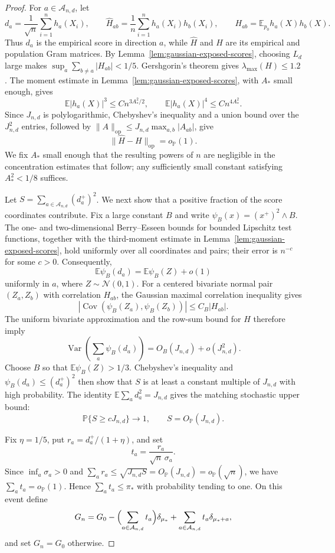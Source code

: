 \documentclass[11pt]{article}
\theoremstyle{definition}
\numberwithin{equation}{section}
\newcommand{\E}{\mathbb{E}}
\newcommand{\wh}{\widehat}
\newcommand{\op}{\mathrm{op}}
\DeclareMathOperator{\Var}{Var}
\DeclareMathOperator{\Cov}{Cov}
\begin{document}
\begin{proof}
For \(a\in\mathcal A_{n,d}\), let
\[
    d_a=\frac1{\sqrt n}\sum_{i=1}^n h_a(X_i),
    \qquad
    \wh H_{ab}=\frac1n\sum_{i=1}^n h_a(X_i)h_b(X_i),
    \qquad
    H_{ab}=\E_{p_0}h_a(X)h_b(X).
\]
Thus \(d_a\) is the empirical score in direction \(a\), while \(\wh H\)
and \(H\) are its empirical and population Gram matrices.
By Lemma~\ref{lem:gaussian-exposed-scores}, choosing \(L_d\) large makes \(\sup_a\sum_{b\ne a}|H_{ab}|<1/5\). Gershgorin's theorem gives \(\lambda_{\max}(H)\le1.2\). The moment estimate in Lemma~\ref{lem:gaussian-exposed-scores}, with \(A_*\) small enough, gives
\[
    \E |h_a(X)|^3\le C n^{3A_*^2/2},
    \qquad
    \E |h_a(X)|^4\le C n^{4A_*^2}.
\]
Since \(J_{n,d}\) is polylogarithmic, Chebyshev's inequality and a union
bound over the \(J_{n,d}^2\) entries, followed by
\(\|A\|_{\op}\le J_{n,d}\max_{a,b}|A_{ab}|\), give
\[
    \|\wh H-H\|_{\op}=o_{\mathbb P}(1).
\]
We fix \(A_*\) small enough that the resulting powers of \(n\) are
negligible in the concentration estimates that follow; any sufficiently small
constant satisfying \(A_*^2<1/8\) suffices.

Let \(S=\sum_{a\in\mathcal A_{n,d}}(d_a^+)^2\). We next show that a positive
fraction of the score coordinates contribute. Fix a large constant \(B\) and
write \(\psi_B(x)=(x^+)^2\wedge B\). The one- and two-dimensional
Berry--Esseen bounds for bounded Lipschitz test functions, together with the
third-moment estimate in Lemma~\ref{lem:gaussian-exposed-scores}, hold
uniformly over all coordinates and pairs;
their error is \(n^{-c}\) for some \(c>0\). Consequently,
\[
    \E\psi_B(d_a)=\E\psi_B(Z)+o(1)
\]
uniformly in \(a\), where \(Z\sim\mathcal N(0,1)\). For a centered bivariate
normal pair \((Z_a,Z_b)\) with correlation \(H_{ab}\), the Gaussian maximal
correlation inequality gives
\[
    |\Cov(\psi_B(Z_a),\psi_B(Z_b))|
    \le C_B|H_{ab}|.
\]
The uniform bivariate approximation and the row-sum bound for \(H\) therefore
imply
\[
    \Var\left(\sum_a\psi_B(d_a)\right)
    =O_B(J_{n,d})+o(J_{n,d}^2).
\]
Choose \(B\) so that \(\E\psi_B(Z)>1/3\). Chebyshev's inequality and
\(\psi_B(d_a)\le(d_a^+)^2\) then show that \(S\) is at least a constant
multiple of \(J_{n,d}\) with high probability. The identity
\(\E\sum_a d_a^2=J_{n,d}\) gives the matching stochastic upper bound:
\[
    \mathbb P\{S\ge cJ_{n,d}\}\to1,
    \qquad
    S=O_{\mathbb P}(J_{n,d}).
\]

Fix \(\eta=1/5\), put \(r_a=d_a^+/(1+\eta)\), and set
\[
    t_a=\frac{r_a}{\sqrt n\,\sigma_a}.
\]
Since \(\inf_a\sigma_a>0\) and \(\sum_a r_a\le\sqrt{J_{n,d}S}=O_{\mathbb P}(J_{n,d})=o_{\mathbb P}(\sqrt n)\), we have \(\sum_a t_a=o_{\mathbb P}(1)\). Hence \(\sum_a t_a\le\pi_*\) with probability tending to one. On this event define
\[
    G_n=
    G_0-
    \Bigl(\sum_{a\in\mathcal A_{n,d}}t_a\Bigr)\delta_{\mu_*}
    +
    \sum_{a\in\mathcal A_{n,d}}t_a\delta_{\mu_*+a},
\]
and set \(G_n=G_0\) otherwise.


\end{proof}
\end{document}
